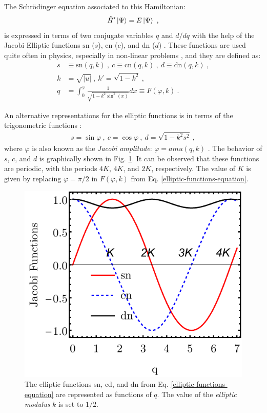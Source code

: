The Schrödinger equation associated to this Hamiltonian:
\begin{align}
    \hat{H}'\ket{\Psi}=E\ket{\Psi}\ ,
\end{align}
is expressed in terms of two conjugate variables $q$ and $d/dq$ with the help of the Jacobi Elliptic functions $\text{sn}$ ($s$), $\text{cn}$ ($c$), and $\text{dn}$ ($d$) \cite{jacobi1829fundamenta,akhiezer1990elements}. These functions are used quite often in physics, especially in non-linear problems \cite{kovacic2016jacobi}, and they are defined as:
\begin{align}
    s&\equiv\text{sn}(q,k)\ ,\ c\equiv\text{cn}(q,k)\ ,\ d\equiv\text{dn}(q,k)\ ,\nonumber\\
    k&=\sqrt{|u|}\ ,\ k'=\sqrt{1-k^2}\ ,\nonumber\\
    q&=\int_0^\varphi \frac{1}{\sqrt{1-k^2\sin^2(x)}}dx\equiv F(\varphi,k)\ .
    \label{elliptic-functions-equation}
\end{align}

An alternative representations for the elliptic functions is in terms of the trigonometric functions \cite{weisstein2002jacobi}:
\begin{align}
    s=\sin\varphi\ ,\ c=\cos\varphi\ ,\ d=\sqrt{1-k^2s^2}\ ,
\end{align}
where $\varphi$ is also known as the \emph{Jacobi amplitude}: $\varphi=amu(q,k)$ \cite{weisstein2002jacobiamu}. The behavior of $s$, $c$, and $d$ is graphically shown in Fig. \ref{elliptic-functions-plot}. It can be observed that these functions are periodic, with the periods $4K$, $4K$, and $2K$, respectively. The value of $K$ is given by replacing $\varphi=\pi/2$ in $F(\varphi,k)$ from Eq. \ref{elliptic-functions-equation}.
\begin{figure}
    \centering
    \includegraphics[scale=0.9]{Chapters/Figures/Jacobi-Elliptic-Functions.pdf}
    \caption{The elliptic functions sn, cd, and dn from Eq. \ref{elliptic-functions-equation} are represented as functions of $q$. The value of the \emph{elliptic modulus} $k$ is set to $1/2$.}
    \label{elliptic-functions-plot}
\end{figure}

